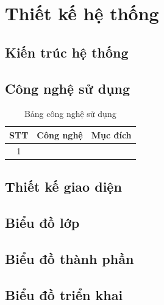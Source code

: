 
\chapter{Thiết kế hệ thống}
\label{chap:thiet_ke_he_thong}

\section{Kiến trúc hệ thống}
\label{sec:kien_truc}



\section{Công nghệ sử dụng}
\label{sec:cong_nghe}

\begin{table}[H]
    \centering
    \begin{tabularx}{\textwidth}{|c|l|X|}
        \hline
        \textbf{STT} & \textbf{Công nghệ} & \textbf{Mục đích} \\
        \hline
        1 & & \\
        \hline
    \end{tabularx}
    \caption{Bảng công nghệ sử dụng}
    \label{tab:cong_nghe}
\end{table}


\section{Thiết kế giao diện}
\label{sec:thiet_ke_giao_dien}



\section{Biểu đồ lớp}
\label{sec:bieu_do_lop}



\section{Biểu đồ thành phần}
\label{sec:bieu_do_thanh_phan}



\section{Biểu đồ triển khai}
\label{sec:bieu_do_trien_khai}

